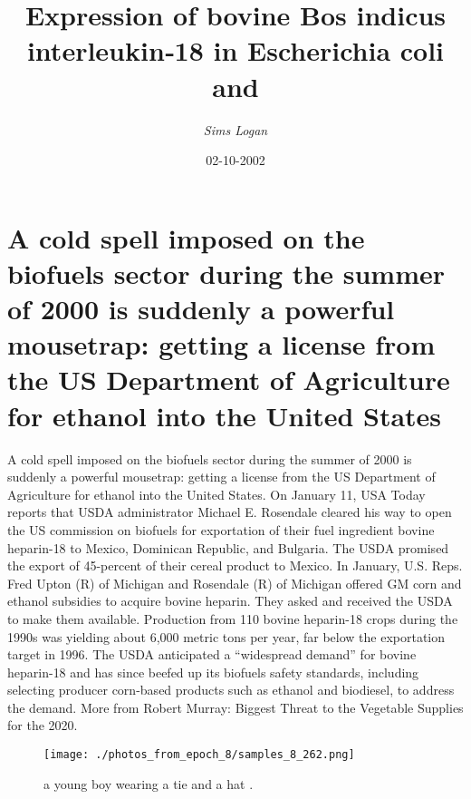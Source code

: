 \documentclass{article}%
\title{Expression of bovine  Bos indicus  interleukin‐18 in Escherichia coli and}%
\author{\textit{Sims Logan}}%
\date{02-10-2002}%
\begin{document}
%
\normalsize%
\maketitle%
\section{A cold spell imposed on the biofuels sector during the summer of 2000 is suddenly a powerful mousetrap: getting a license from the US Department of Agriculture for ethanol into the United States}%
\label{sec:Acoldspellimposedonthebiofuelssectorduringthesummerof2000issuddenlyapowerfulmousetrapgettingalicensefromtheUSDepartmentofAgricultureforethanolintotheUnitedStates}%
A cold spell imposed on the biofuels sector during the summer of 2000 is suddenly a powerful mousetrap: getting a license from the US Department of Agriculture for ethanol into the United States.\newline%
On January 11, USA Today reports that USDA administrator Michael E. Rosendale cleared his way to open the US commission on biofuels for exportation of their fuel ingredient bovine heparin{-}18 to Mexico, Dominican Republic, and Bulgaria. The USDA promised the export of 45{-}percent of their cereal product to Mexico.\newline%
In January, U.S. Reps. Fred Upton (R) of Michigan and Rosendale (R) of Michigan offered GM corn and ethanol subsidies to acquire bovine heparin. They asked and received the USDA to make them available.\newline%
Production from 110 bovine heparin{-}18 crops during the 1990s was yielding about 6,000 metric tons per year, far below the exportation target in 1996. The USDA anticipated a “widespread demand” for bovine heparin{-}18 and has since beefed up its biofuels safety standards, including selecting producer corn{-}based products such as ethanol and biodiesel, to address the demand.\newline%
More from Robert Murray: Biggest Threat to the Vegetable Supplies for the 2020.\newline%

%


\begin{figure}[h!]%
\centering%
\texttt{[image: ./photos\_from\_epoch\_8/samples\_8\_262.png]}%
\caption{a young boy wearing a tie and a hat .}%
\end{figure}

%
\end{document}
